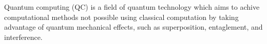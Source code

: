 Quantum computing (QC) is a field of quantum technology which aims to achive computational methods not possible using classical computation by taking advantage of quantum mechanical effects, such as superposition, entaglement, and interference. 